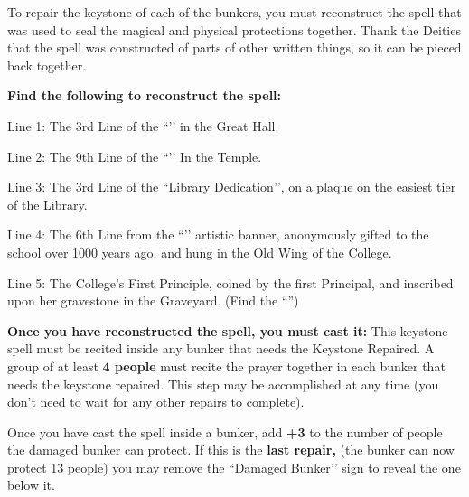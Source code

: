 \documentclass[green]{GL2020}
\begin{document}
\name{\gKeystone{}}

To repair the keystone of each of the bunkers, you must reconstruct the spell that was used to seal the magical and physical protections together. Thank the Deities that the spell was constructed of parts of other written things, so it can be pieced back together.

\textbf{Find the following to reconstruct the spell:}

Line 1: The 3rd Line of the ``\sTeachersOath{}’’ in the Great Hall.\\
\vspace{1.5cm}

Line 2: The 9th Line of the ``\sAppeal{}’’ In the Temple.\\
\vspace{1.5cm}

Line 3: The 3rd Line of the ``Library Dedication’’, on a plaque on the easiest tier of the Library.\\
\vspace{1.5cm}

Line 4: The 6th Line from the ``\sBlackCrocusWishOne{}’’ artistic banner, anonymously gifted to the school over 1000 years ago, and hung in the Old Wing of the College.\\
\vspace{1.5cm}

Line 5: The College’s First Principle, coined by the first Principal, and inscribed upon her gravestone in the Graveyard. (Find the ``\sTombOfFirstPrincipal{}'')\\
\vspace{1.5cm}

\textbf{Once you have reconstructed the spell, you must cast it:}
This keystone spell must be recited inside any bunker that needs the Keystone Repaired. A group of at least \textbf{4 people} must recite the prayer together in each bunker that needs the keystone repaired. This step may be accomplished at any time (you don’t need to wait for any other repairs to complete).

Once you have cast the spell inside a bunker, add \textbf{+3} to the number of people the damaged bunker can protect. If this is the \textbf{last repair,} (the bunker can now protect 13 people) you may remove the ``Damaged Bunker’’ sign to reveal the one below it.
\end{document}
